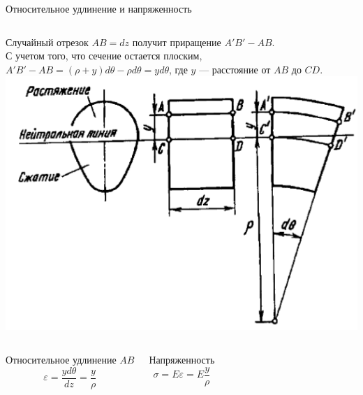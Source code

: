 \documentclass[ignoreonframetext,unicode]{beamer}
\begin{document}
	\begin{frame}{Относительное удлинение и напряженность}
		
	\begin{columns}	
	Случайный отрезок $AB = dz$ получит приращение $A'B' - AB$. \\
	С учетом того, что сечение остается плоским,\\ $A'B' - AB = (\rho + y)d\theta - \rho d\theta = yd\theta$, где $y$ --- расстояние от $AB$ до $CD$. 
	\includegraphics[width=\textwidth]{pic.4}
	\end{columns}
	\begin{columns}
		\column{0.5\textwidth}
		\begin{block}{Относительное удлинение $AB$}	
			\[
			\varepsilon = \frac {y d\theta}{dz} = \frac{y}{\rho}
			\]
		\end{block}
		\column{0.5\textwidth}
		\begin{block}{Напряженность}	
			\[
			\sigma = E \varepsilon = E \frac{y}{\rho}
			\]
		\end{block}
	\end{columns}
	\end{frame}
\end{document}
